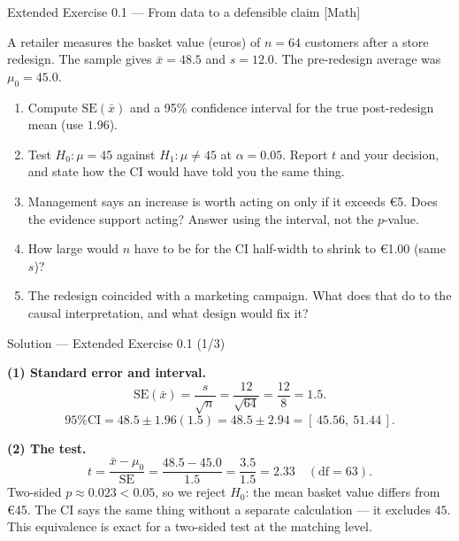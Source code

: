 \documentclass[aspectratio=169,11pt]{beamer}
\begin{document}
\begin{frame}{Extended Exercise 0.1 --- From data to a defensible claim [Math]}
  \begin{longexercise}
    A retailer measures the basket value (euros) of $n = 64$ customers after
    a store redesign. The sample gives $\bar x = 48.5$ and $s = 12.0$. The
    pre-redesign average was $\mu_0 = 45.0$.
    \begin{enumerate}
      \item Compute $\mathrm{SE}(\bar x)$ and a 95\% confidence interval for
            the true post-redesign mean (use $1.96$).
      \item Test $H_0: \mu = 45$ against $H_1: \mu \ne 45$ at $\alpha = 0.05$.
            Report $t$ and your decision, and state how the CI would have
            told you the same thing.
      \item Management says an increase is worth acting on only if it exceeds
            \euro 5. Does the evidence support acting? Answer using the
            interval, not the $p$-value.
      \item How large would $n$ have to be for the CI half-width to shrink to
            \euro 1.00 (same $s$)?
      \item The redesign coincided with a marketing campaign. What does that
            do to the causal interpretation, and what design would fix it?
    \end{enumerate}
  \end{longexercise}
\end{frame}

\begin{frame}{Solution --- Extended Exercise 0.1 (1/3)}
  \begin{solutionbox}
    \textbf{(1) Standard error and interval.}
    \[
      \mathrm{SE}(\bar x) = \frac{s}{\sqrt n} = \frac{12}{\sqrt{64}}
      = \frac{12}{8} = 1.5 .
    \]
    \[
      \text{95\% CI} = 48.5 \pm 1.96(1.5) = 48.5 \pm 2.94
      = [\,45.56,\ 51.44\,] .
    \]

    \textbf{(2) The test.}
    \[
      t = \frac{\bar x - \mu_0}{\mathrm{SE}} = \frac{48.5 - 45.0}{1.5}
        = \frac{3.5}{1.5} = 2.33 \quad (\text{df} = 63).
    \]
    Two-sided $p \approx 0.023 < 0.05$, so we reject $H_0$: the mean basket
    value differs from \euro 45. The CI says the same thing without a
    separate calculation --- it excludes $45$. This equivalence is exact for
    a two-sided test at the matching level.
  \end{solutionbox}
\end{frame}
\end{document}
